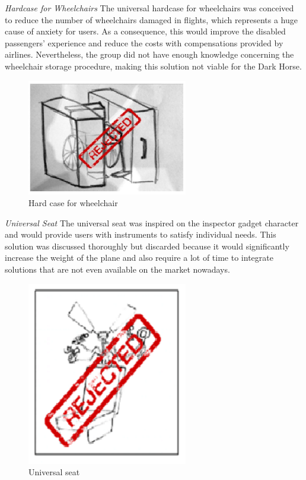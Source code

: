 \emph{Hardcase for Wheelchairs} The universal hardcase for wheelchairs was conceived to reduce the number of wheelchairs damaged in flights, which represents a huge cause of anxiety for users. As a consequence, this would improve the disabled passengers’ experience and reduce the costs with compensations provided by airlines. Nevertheless, the group did not have enough knowledge concerning the wheelchair storage procedure, making this solution not viable for the Dark Horse. \\

\begin{figure}[h]
\centering
\includegraphics[width=7cm]{brazil_images/image008.jpg}
\caption{Hard case for wheelchair}
\label{fig:hardcase}
\end{figure}

\emph{Universal Seat} The universal seat was inspired on the inspector gadget character and would provide users with instruments to satisfy individual needs. This solution was discussed thoroughly but discarded because it would significantly increase the weight of the plane and also require a lot of time to integrate solutions that are not even available on the market nowadays. 

\begin{figure}[h]
\centering
\includegraphics[width=7cm]{brazil_images/image009.png}
\caption{Universal seat}
\label{fig:universal_seat}
\end{figure}

